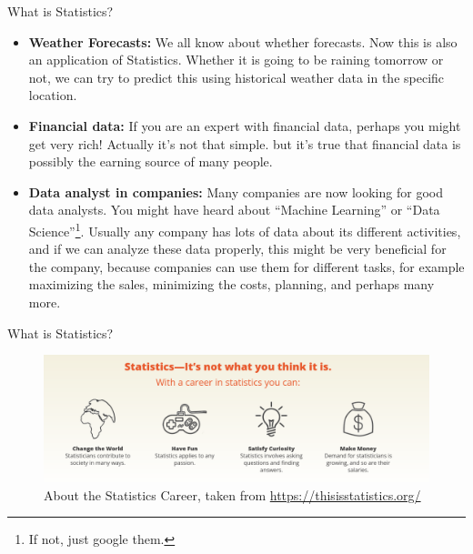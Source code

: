 \documentclass[8pt, usepdftitle=false]{beamer}
\begin{document}
\begin{frame}{What is Statistics?}
\begin{itemize}


\item
  \textbf{Weather Forecasts:} We all know about whether forecasts. Now this is also an application of Statistics. Whether it is going to be raining tomorrow or not, we can try to predict this using historical weather data in the specific location. 
\item
  \textbf{Financial data:} If you are an expert with financial data, perhaps you might get very rich! Actually it's not that simple. but it's true that financial data is possibly the earning source of many people.

  \item \textbf{Data analyst in companies:} Many companies are now looking for good data analysts. You might have heard about ``Machine Learning'' or ``Data Science''\footnote[frame]{If not, just google them.}. Usually any company has lots of data about its different activities, and if we can analyze these data properly, this might be very beneficial for the company, because companies can use them for different tasks, for example maximizing the sales, minimizing the costs, planning, and perhaps many more.


\end{itemize}
\end{frame}



\begin{frame}{What is Statistics?}

\begin{figure}
\includegraphics[scale = .3]{Images/statistics_career.png}
\caption{About the Statistics Career, taken from \url{https://thisisstatistics.org/}}
\end{figure}


\end{frame}
\end{document}
